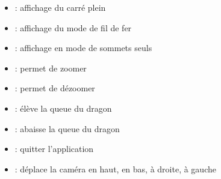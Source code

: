\documentclass{article}
\begin{document}
\begin{itemize}
\item {} : affichage du carré plein
\item {} : affichage du mode de fil de fer
\item {} : affichage en mode de sommets seuls
\item {} : permet de zoomer
\item {} : permet de dézoomer 
\item {} : élève la queue du dragon
\item {} : abaisse la queue du dragon 
\item {} : quitter l'application 
\item \UArrow \DArrow \LArrow \RArrow : déplace la caméra en haut, en bas, à droite, à gauche
\end{itemize}

\end{document}
